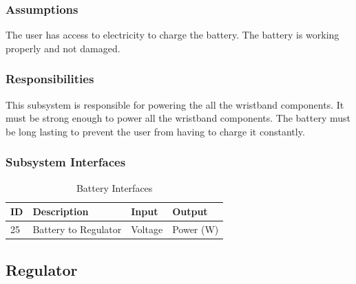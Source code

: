 \subsubsection{Assumptions}
The user has access to electricity to charge the battery. The battery is working properly and not damaged. 

\subsubsection{Responsibilities}
This subsystem is responsible for powering the all the wristband components. It must be strong enough to power all the wristband components. The battery must be long lasting to prevent the user from having to charge it constantly. 

\subsubsection{Subsystem Interfaces}

\begin{table}[H]
\caption{Battery Interfaces}
\begin{center}
\begin{tabular}{|l|l|l|l|}
    \hline
    ID & Description & Input & Output \\ \hline
    25 & Battery to Regulator  & Voltage  & Power (W)  \\ \hline
\end{tabular}
\end{center}
\end{table}

\subsection{Regulator}

